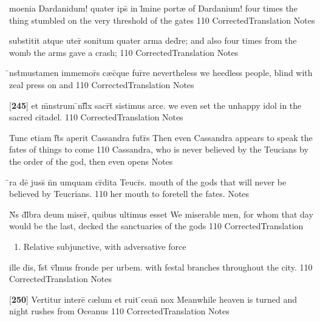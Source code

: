 \latline
  {moenia Dardanidum! quater ips\={} in l\={\macron {\i}}mine port{\ae}}
  { of Dardanium!  four times the thing stumbled on the very threshold of the gates }
  {110}
  { CorrectedTranslation }
  { Notes }


\latline
  {substitit atque uter\={} sonitum quater arma ded\={}re;}
  { and also four times from the womb the arms gave a crash; }
  {110}
  { CorrectedTranslation }
  { Notes }


\latline
  {\={\macron {\i}}nst\={}mustamen immemor\={}s c{\ae}c\={\macron {\i}}que fur\={}re}
  { nevertheless we heedless people, blind with zeal press on and }
  {110}
  { CorrectedTranslation }
  { Notes }


\latline
  {[\textbf{245}] et m\={}nstrum \={\macron {\i}}nf\={}l\={\macron {\i}}x sacr\={}t\={} sistimus arce.}
  { we even set the unhappy idol in the sacred citadel. }
  {110}
  { CorrectedTranslation }
  { Notes }


\latline
  {Tunc etiam f\={}t\={\macron {\i}}s aperit Cassandra fut\={}r\={\macron {\i}}s}
  { Then even Cassandra appears to speak the fates of things to come }
  {110}
  { Cassandra, who is never believed by the Teucians by the order of the god, then even opens }
  { Notes }


\latline
  {\={}ra de\={\macron {\i}}  juss\={} n\={}n umquam cr\={}dita Teucr\={\macron {\i}}s.}
  { mouth of the gods that will never be believed by Teucrians.  }
  {110}
  { her mouth to foretell the fates.  }
  { Notes }


\latline
  {N\={}s d\={}l\={}bra deum miser\={\macron {\i}}, quibus ultimus esset}
  { We miserable men, for whom that day would be the last, decked the sanctuaries of the gods }
  {110}
  { CorrectedTranslation }
  { \begin{enumerate}
  	\item Relative subjunctive, with adversative force
  \end{enumerate} }


\latline
  {ille di\={}s, f\={}st\={} v\={}l\={}mus fronde per urbem.}
  { with festal branches throughout the city. }
  {110}
  { CorrectedTranslation }
  { Notes }


\latline
  {[\textbf{250}] Vertitur intere\={} c{\ae}lum et ruit \={}cean\={} nox}
  { Meanwhile heaven is turned and night rushes from Oceanus }
  {110}
  { CorrectedTranslation }
  { Notes }
